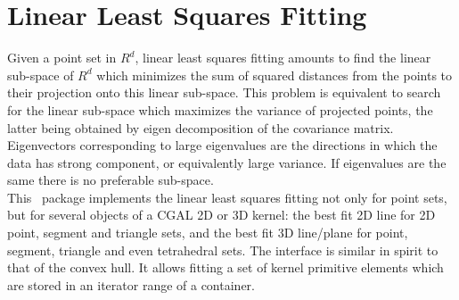 
\chapter{Linear Least Squares Fitting}
\label{chap:PCA}

Given a point set in $R^d$, linear least squares fitting amounts to
find the linear sub-space of $R^d$ which minimizes the sum of squared
distances from the points to their projection onto this linear
sub-space. This problem is equivalent to search for the linear
sub-space which maximizes the variance of projected points, the latter
being obtained by eigen decomposition of the covariance
matrix. Eigenvectors corresponding to large eigenvalues are the
directions in which the data has strong component, or equivalently
large variance. If eigenvalues are the same there is no preferable
sub-space.\\

This \cgal\ package implements the linear least squares fitting not
only for point sets, but for several objects of a CGAL 2D or 3D
kernel: the best fit 2D line for 2D point, segment and triangle sets,
and the best fit 3D line/plane for point, segment, triangle and even
tetrahedral sets. The interface is similar in spirit to that of the
convex hull. It allows fitting a set of kernel primitive elements
which are stored in an iterator range of a container.

\\

\\
\\
\\
\clearpage

